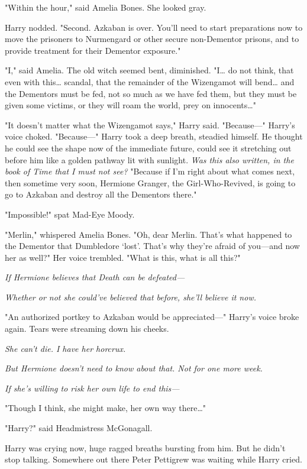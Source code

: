 "Within the hour," said Amelia Bones. She looked gray.

Harry nodded. "Second. Azkaban is over. You'll need to start preparations now
to move the prisoners to Nurmengard or other secure non-Dementor prisons, and
to provide treatment for their Dementor exposure."

"I," said Amelia. The old witch seemed bent, diminished. "I{\ldots} do not
think, that even with this{\ldots} scandal, that the remainder of the
Wizengamot will bend{\ldots} and the Dementors must be fed, not so much as we
have fed them, but they must be given some victims, or they will roam the
world, prey on innocents{\ldots}"

"It doesn't matter what the Wizengamot says," Harry said. "Because---" Harry's
voice choked. "Because---" Harry took a deep breath, steadied himself. He
thought he could see the shape now of the immediate future, could see it
stretching out before him like a golden pathway lit with sunlight. \emph{Was
this also written, in the book of Time that I must not see?} "Because if I'm
right about what comes next, then sometime very soon, Hermione Granger, the
Girl-Who-Revived, is going to go to Azkaban and destroy all the Dementors
there."

"Impossible!" spat Mad-Eye Moody.

"Merlin," whispered Amelia Bones. "Oh, dear Merlin. That's what happened to the
Dementor that Dumbledore `lost'. That's why they're afraid of you---and now her
as well?" Her voice trembled. "What is this, what is all this?"

\emph{If Hermione believes that Death can be defeated---}

\emph{Whether or not she could've believed that before, she'll believe it now.}

"An authorized portkey to Azkaban would be appreciated---" Harry's voice broke
again. Tears were streaming down his cheeks.

\emph{She can't die. I have her horcrux.}

\emph{But Hermione doesn't need to know about that. Not for one more week.}

\emph{If she's willing to risk her own life to end this---}

"Though I think, she might make, her own way there{\ldots}"

"Harry?" said Headmistress McGonagall.

Harry was crying now, huge ragged breaths bursting from him. But he didn't stop
talking. Somewhere out there Peter Pettigrew was waiting while Harry cried.

